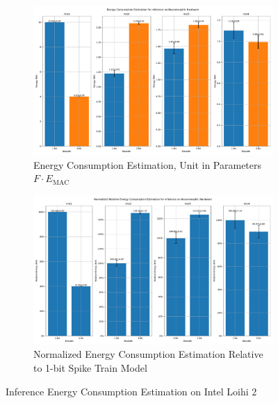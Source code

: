         \begin{figure}[H]
            \centering
            \begin{subfigure}[H]{0.48\textwidth}
                \includegraphics[width=\textwidth]{../timesteps/CIFAR10/plots/cifar10_test_energy_nh.pdf}
                \caption{Energy Consumption Estimation, Unit in Parameters $F\cdot E_{\text{MAC}}$}
            \end{subfigure}
            \hfill
            \begin{subfigure}[H]{0.48\textwidth}
                \includegraphics[width=\textwidth]{../timesteps/CIFAR10/plots/cifar10_test_relative_energy_nh.pdf}
                \caption{Normalized Energy Consumption Estimation Relative to 1-bit Spike Train Model}
            \end{subfigure}
            \caption{Inference Energy Consumption Estimation on Intel Loihi 2}
        \end{figure}
